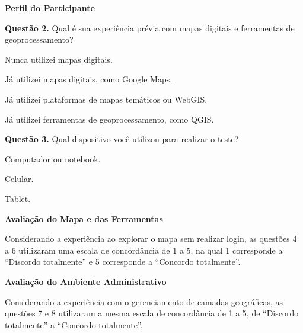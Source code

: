 \noindent\textbf{Perfil do Participante}
\par\medskip

\noindent\textbf{Questão 2.} Qual é sua experiência prévia com mapas digitais e ferramentas de geoprocessamento?
\begin{alternativasFormulario}
    \item Nunca utilizei mapas digitais.
    \item Já utilizei mapas digitais, como Google Maps.
    \item Já utilizei plataformas de mapas temáticos ou WebGIS.
    \item Já utilizei ferramentas de geoprocessamento, como QGIS.
\end{alternativasFormulario}

\noindent\textbf{Questão 3.} Qual dispositivo você utilizou para realizar o teste?
\begin{alternativasFormulario}
    \item Computador ou notebook.
    \item Celular.
    \item Tablet.
\end{alternativasFormulario}

\noindent\textbf{Avaliação do Mapa e das Ferramentas}
\par\medskip

Considerando a experiência ao explorar o mapa sem realizar login, as questões 4 a 6 utilizaram uma escala de concordância de 1 a 5, na qual 1 corresponde a ``Discordo totalmente'' e 5 corresponde a ``Concordo totalmente''.

\medskip
{}



\noindent\textbf{Avaliação do Ambiente Administrativo}
\par\medskip

Considerando a experiência com o gerenciamento de camadas geográficas, as questões 7 e 8 utilizaram a mesma escala de concordância de 1 a 5, de ``Discordo totalmente'' a ``Concordo totalmente''.

\medskip
{}

